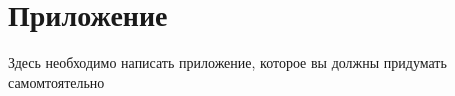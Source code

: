 \section{Приложение}
\label{sec:Apendix} 

Здесь необходимо написать приложение, которое вы должны придумать самомтоятельно